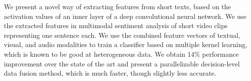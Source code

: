 We present a novel way of extracting features from short texts, based on the activation values of an inner layer of a deep convolutional neural network. We use the extracted features in multimodal sentiment analysis of short video clips representing one sentence each. We use the combined feature vectors of textual, visual, and audio modalities to train a classifier based on multiple kernel learning, which is known to be good at heterogeneous data. We obtain 14\% performance improvement over the state of the art and present a parallelizable decision-level data fusion method, which is much faster, though slightly less accurate.
